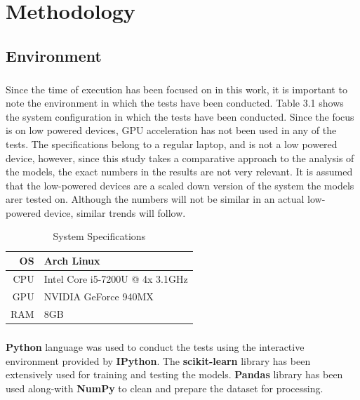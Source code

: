 \chapter{Methodology}
\label{ch:PD}

\section{Environment}

\paragraph{}
Since the time of execution has been focused on in this work, it is important to note the environment in which the tests have been conducted. Table 3.1 shows the system configuration in which the tests have been conducted. Since the focus is on low powered devices, GPU acceleration has not been used in any of the tests. The specifications belong to a regular laptop, and is not a low powered device, however, since this study takes a comparative approach to the analysis of the models, the exact numbers in the results are not very relevant. It is assumed that the low-powered devices are a scaled down version of the system the models arer tested on. Although the numbers will not be similar in an actual low-powered device, similar trends will follow.
\begin{table}[h]
    \centering
    \caption{System Specifications}
    \begin{tabular}{| r | l |}
        \hline
        OS & Arch Linux \\
        \hline
        CPU & Intel Core i5-7200U @ 4x 3.1GHz \\
        \hline
        GPU & NVIDIA GeForce 940MX \\
        \hline
        RAM & 8GB \\
        \hline
    \end{tabular}
\end{table}

\paragraph{}
\textbf{Python} language was used to conduct the tests using the interactive environment provided by \textbf{IPython}. The \textbf{scikit-learn} library has been extensively used for training and testing the models. \textbf{Pandas} library has been used along-with \textbf{NumPy} to clean and prepare the dataset for processing.

